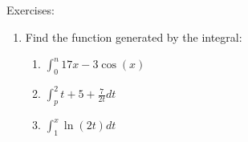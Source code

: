 \documentclass[../revisedmain.tex]{subfiles}
\begin{document}
	\newpage
	\begin{center}
		\LARGE Exercises:
	\end{center}
	\begin{enumerate}
		\item Find the function generated by the integral:
		\begin{enumerate}
			\item $\int_{0}^{n}17x-3\cos(x)$
			\item $\int_{p}^{2}t+5+\frac{7}{2t}dt$
			\item $\int_{1}^{x}\ln(2t)dt$
		\end{enumerate}
	\end{enumerate}
\end{document}
